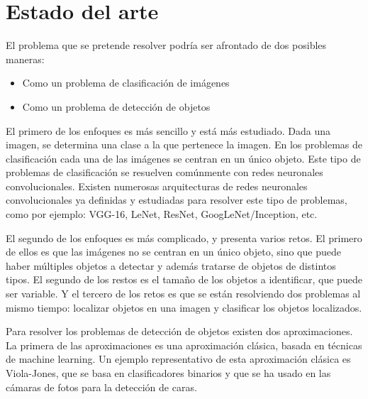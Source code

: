 \section{Estado del arte}
\label{sec:estado_del_arte}


El problema que se pretende resolver podría ser afrontado de dos posibles maneras:

\begin{itemize}
	\item Como un problema de clasificación de imágenes
	\item Como un problema de detección de objetos
\end{itemize}

El primero de los enfoques es más sencillo y está más estudiado. Dada una imagen, se determina una clase a la que pertenece la imagen. En los problemas de clasificación cada una de las imágenes se centran en un único objeto. Este tipo de problemas de clasificación se resuelven comúnmente con redes neuronales convolucionales. Existen numerosas arquitecturas de redes neuronales convolucionales ya definidas y estudiadas para resolver este tipo de problemas, como por ejemplo: VGG-16, LeNet, ResNet, GoogLeNet/Inception, etc.

El segundo de los enfoques es más complicado, y presenta varios retos. El primero de ellos es que las imágenes no se centran en un único objeto, sino que puede haber múltiples objetos a detectar y además tratarse de objetos de distintos tipos. El segundo de los restos es el tamaño de los objetos a identificar, que puede ser variable. Y el tercero de los retos es que se están resolviendo dos problemas al mismo tiempo: localizar objetos en una imagen y clasificar los objetos localizados.

Para resolver los problemas de detección de objetos existen dos aproximaciones. La primera de las aproximaciones es una aproximación clásica, basada en técnicas de machine learning. Un ejemplo representativo de esta aproximación clásica es Viola-Jones, que se basa en clasificadores binarios y que se ha usado en las cámaras de fotos para la detección de caras.

